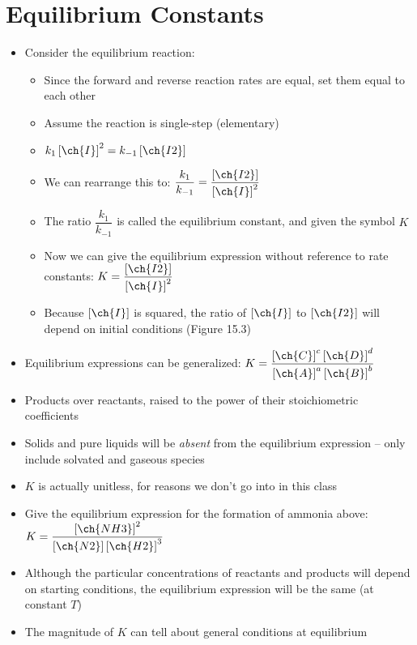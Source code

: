 \documentclass[12pt, openany, letterpaper]{memoir}
\begin{document}
\section{Equilibrium Constants}
\begin{itemize}
	\item Consider the equilibrium reaction: 
	\begin{itemize}
		\item Since the forward and reverse reaction rates are equal, set them equal to each other
		\item Assume the reaction is single-step (elementary)
		\item $k_1\left[\ch{I}\right]^2=k_{-1}\left[\ch{I2}\right]$
		\item We can rearrange this to: $\dfrac{k_1}{k_{-1}}=\dfrac{\left[\ch{I2}\right]}{\left[\ch{I}\right]^2}$
		\item The ratio $\dfrac{k_1}{k_{-1}}$ is called the equilibrium constant, and given the symbol $K$
		\item Now we can give the equilibrium expression without reference to rate constants: $K = \dfrac{\left[\ch{I2}\right]}{\left[\ch{I}\right]^2}$
		\item Because $\left[\ch{I}\right]$ is squared, the ratio of $\left[\ch{I}\right]$ to $\left[\ch{I2}\right]$ will depend on initial conditions (Figure 15.3)		
	\end{itemize}
	\item Equilibrium expressions can be generalized: \hspace{1em}$K=\dfrac{\left[\ch{C}\right]^c\left[\ch{D}\right]^d}{\left[\ch{A}\right]^a\left[\ch{B}\right]^b}$ 
	\item Products over reactants, raised to the power of their stoichiometric coefficients
	\item Solids and pure liquids will be \emph{absent} from the equilibrium expression -- only include solvated and gaseous species
	\item $K$ is actually unitless, for reasons we don't go into in this class
	\item Give the equilibrium expression for the formation of ammonia above: $K=\dfrac{\left[\ch{NH3}\right]^2}{\left[\ch{N2}\right]\left[\ch{H2}\right]^3}$
	\item Although the particular concentrations of reactants and products will depend on starting conditions, the equilibrium expression will be the same (at constant $T$)
	\item The magnitude of $K$ can tell about general conditions at equilibrium

\end{itemize}
\end{document}
